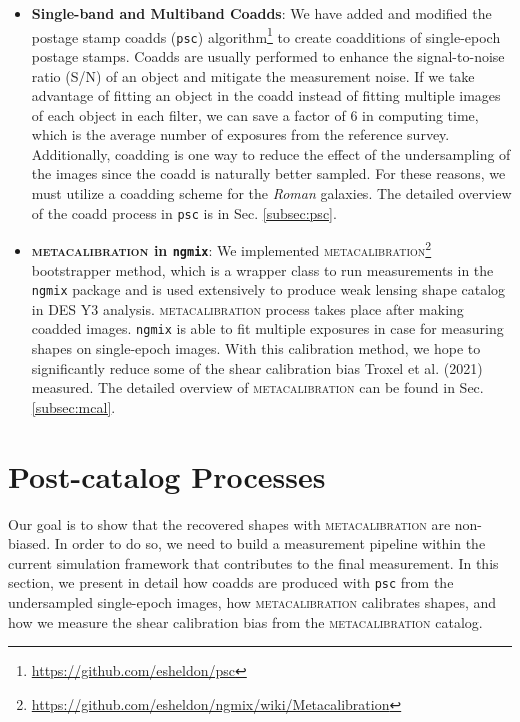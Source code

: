 {\begin{itemize}
    \item \textbf{Single-band and Multiband Coadds}: 
    We have added and modified the postage stamp coadds (\texttt{psc}) algorithm\footnote{\url{https://github.com/esheldon/psc}} to create coadditions of single-epoch postage stamps. Coadds are usually performed to enhance the signal-to-noise ratio (S/N) of an object and mitigate the measurement noise. If we take advantage of fitting an object in the coadd instead of fitting multiple images of each object in each filter, we can save a factor of 6 in computing time, which is the average number of exposures from the reference survey. Additionally, coadding is one way to reduce the effect of the undersampling of the images since the coadd is naturally better sampled. For these reasons, we must utilize a coadding scheme for the \emph{Roman} galaxies. The detailed overview of the coadd process in \texttt{psc} is in Sec. \ref{subsec:psc}. 
    
    \item \textbf{\textsc{metacalibration} in \texttt{ngmix}}: We implemented \textsc{metacalibration}\footnote{\url{https://github.com/esheldon/ngmix/wiki/Metacalibration}} bootstrapper method, which is a wrapper class to run measurements in the \texttt{ngmix} package and is used extensively to produce weak lensing shape catalog in DES Y3 analysis. \textsc{metacalibration} process takes place after making coadded images. \texttt{ngmix} is able to fit multiple exposures in case for measuring shapes on single-epoch images. With this calibration method, we hope to significantly reduce some of the shear calibration bias Troxel et al. (2021) measured. The detailed overview of \textsc{metacalibration} can be found in Sec.\ref{subsec:mcal}. 
\end{itemize}



\section{Post-catalog Processes}
\label{sec:methods}
Our goal is to show that the recovered shapes with \textsc{metacalibration} are non-biased. In order to do so, we need to build a measurement pipeline within the current simulation framework that contributes to the final measurement. In this section, we present in detail how coadds are produced with \texttt{psc} from the undersampled single-epoch images, how \textsc{metacalibration} calibrates shapes, and how we measure the shear calibration bias from the \textsc{metacalibration} catalog. 


}
